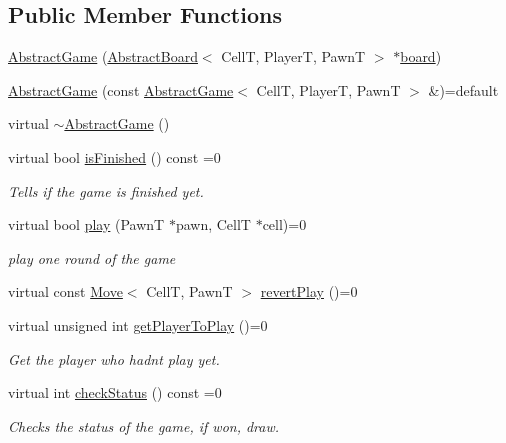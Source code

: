 \subsection*{Public Member Functions}
\begin{DoxyCompactItemize}
\item 
\hyperlink{classgame_1_1_abstract_game_ae01d0d7523f6958450a404e6aafa5cd0}{Abstract\+Game} (\hyperlink{classgame_1_1_abstract_board}{Abstract\+Board}$<$ CellT, PlayerT, PawnT $>$ $\ast$\hyperlink{classgame_1_1_abstract_game_a6df5f611daa1731c4c8d3d5e6289e7e5}{board})
\item 
\hyperlink{classgame_1_1_abstract_game_a4947b8268696a1d6d2d15bfad1cbe197}{Abstract\+Game} (const \hyperlink{classgame_1_1_abstract_game}{Abstract\+Game}$<$ CellT, PlayerT, PawnT $>$ \&)=default
\item 
virtual \hyperlink{classgame_1_1_abstract_game_aadcf523d247e4f8beccc539a08f40464}{$\sim$\+Abstract\+Game} ()
\item 
virtual bool \hyperlink{classgame_1_1_abstract_game_a598679eebf40ccc300e9065bce875fd1}{is\+Finished} () const =0
\begin{DoxyCompactList}\small\item\em Tells if the game is finished yet. \end{DoxyCompactList}\item 
virtual bool \hyperlink{classgame_1_1_abstract_game_a5eb974a047c5179c28cf77ec60d77cdc}{play} (PawnT $\ast$pawn, CellT $\ast$cell)=0
\begin{DoxyCompactList}\small\item\em play one round of the game \end{DoxyCompactList}\item 
virtual const \hyperlink{structgame_1_1_move}{Move}$<$ CellT, PawnT $>$ \hyperlink{classgame_1_1_abstract_game_af6088ae12ed47989dde7f8869e79d934}{revert\+Play} ()=0
\item 
virtual unsigned int \hyperlink{classgame_1_1_abstract_game_a059d72564d4658be3c246d8865080d92}{get\+Player\+To\+Play} ()=0
\begin{DoxyCompactList}\small\item\em Get the player who hadn\textquotesingle{}t play yet. \end{DoxyCompactList}\item 
virtual int \hyperlink{classgame_1_1_abstract_game_a3683d4f37908f769a470af6ebf73d849}{check\+Status} () const =0
\begin{DoxyCompactList}\small\item\em Checks the status of the game, if won, draw. \end{DoxyCompactList}\item 

\end{DoxyCompactItemize}

